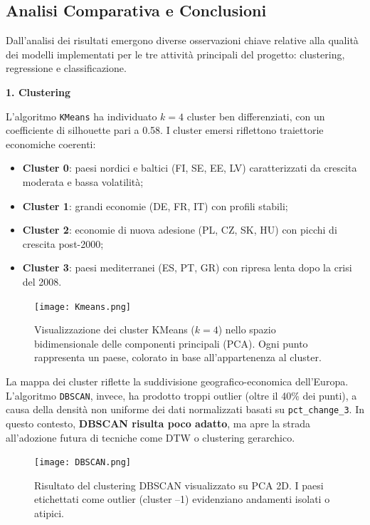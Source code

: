 \documentclass[conference]{IEEEtran}
\begin{document}
\begin{itemize}
\section*{\Large \textbf{Analisi Comparativa e Conclusioni}}

Dall’analisi dei risultati emergono diverse osservazioni chiave relative alla qualità dei modelli implementati per le tre attività principali del progetto: clustering, regressione e classificazione.

\noindent\textbf{1. Clustering}

L’algoritmo \texttt{KMeans} ha individuato $k = 4$ cluster ben differenziati, con un coefficiente di silhouette pari a 0.58. I cluster emersi riflettono traiettorie economiche coerenti:

\begin{itemize}
  \item \textbf{Cluster 0}: paesi nordici e baltici (FI, SE, EE, LV) caratterizzati da crescita moderata e bassa volatilità;
  \item \textbf{Cluster 1}: grandi economie (DE, FR, IT) con profili stabili;
  \item \textbf{Cluster 2}: economie di nuova adesione (PL, CZ, SK, HU) con picchi di crescita post-2000;
  \item \textbf{Cluster 3}: paesi mediterranei (ES, PT, GR) con ripresa lenta dopo la crisi del 2008.
\end{itemize}
\begin{figure}[H]
\centering
\texttt{[image: Kmeans.png]}
\caption{Visualizzazione dei cluster KMeans ($k=4$) nello spazio bidimensionale delle componenti principali (PCA). Ogni punto rappresenta un paese, colorato in base all’appartenenza al cluster.}
\label{fig:kmeans-cluster-map}
\end{figure}



La mappa dei cluster riflette la suddivisione geografico-economica dell’Europa. L’algoritmo \texttt{DBSCAN}, invece, ha prodotto troppi outlier (oltre il 40\% dei punti), a causa della densità non uniforme dei dati normalizzati basati su \texttt{pct\_change\_3}. In questo contesto, \textbf{DBSCAN risulta poco adatto}, ma apre la strada all’adozione futura di tecniche come DTW o clustering gerarchico.
\begin{figure}[H]
\centering
\texttt{[image: DBSCAN.png]}
\caption{Risultato del clustering DBSCAN visualizzato su PCA 2D. I paesi etichettati come outlier (cluster –1) evidenziano andamenti isolati o atipici.}
\label{fig:dbscan-pca}
\end{figure}



\end{itemize}
\end{document}
